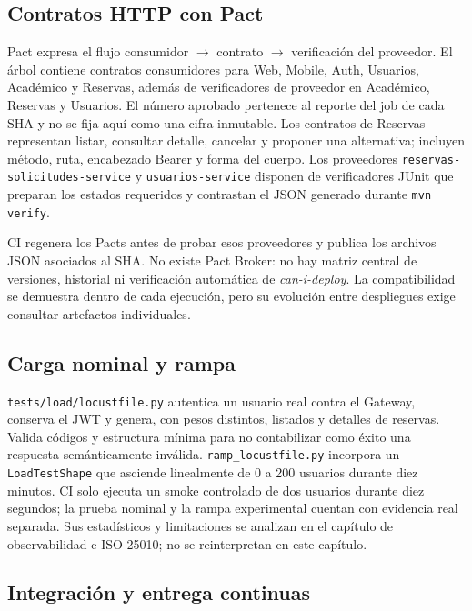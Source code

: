 \subsection{Contratos HTTP con Pact}
\label{subsec:pact}

Pact expresa el flujo consumidor $\rightarrow$ contrato $\rightarrow$
verificación del proveedor. El árbol contiene contratos consumidores para Web,
Mobile, Auth, Usuarios, Académico y Reservas, además de verificadores de
proveedor en Académico, Reservas y Usuarios. El número aprobado pertenece al
reporte del job de cada SHA y no se fija aquí como una cifra inmutable. Los contratos de
Reservas representan listar, consultar detalle, cancelar y proponer una
alternativa; incluyen método, ruta, encabezado Bearer y forma del cuerpo. Los
proveedores \texttt{reservas-solicitudes-service} y
\texttt{usuarios-service} disponen de verificadores JUnit que preparan los
estados requeridos y contrastan el JSON generado durante \texttt{mvn verify}.

CI regenera los Pacts antes de probar esos proveedores y publica los archivos
JSON asociados al SHA. No existe Pact Broker: no hay matriz central de versiones,
historial ni verificación automática de \emph{can-i-deploy}. La compatibilidad se
demuestra dentro de cada ejecución, pero su evolución entre despliegues exige
consultar artefactos individuales.

\subsection{Carga nominal y rampa}
\label{subsec:carga-locust}

\texttt{tests/load/locustfile.py} autentica un usuario real contra el Gateway,
conserva el JWT y genera, con pesos distintos, listados y detalles de reservas.
Valida códigos y estructura mínima para no contabilizar como éxito una respuesta
semánticamente inválida. \texttt{ramp\_locustfile.py} incorpora un
\texttt{LoadTestShape} que asciende linealmente de 0 a 200 usuarios durante diez
minutos. CI solo ejecuta un smoke controlado de dos usuarios durante diez
segundos; la prueba nominal y la rampa experimental cuentan con evidencia real
separada. Sus estadísticos y limitaciones se analizan en el capítulo de
observabilidad e ISO 25010; no se reinterpretan en este capítulo.

\subsection{Integración y entrega continuas}
\label{subsec:ci-cd}

